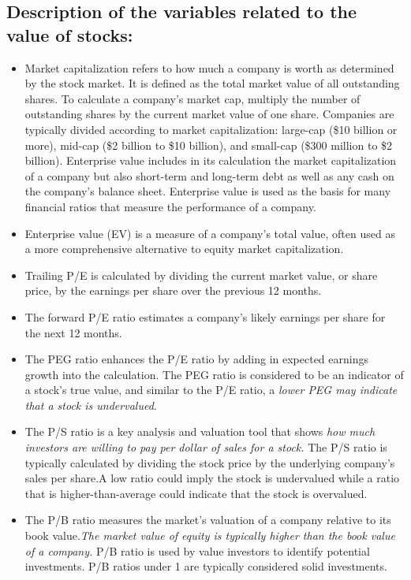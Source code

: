 \documentclass[11pt,a4paper,]{article}
\providecommand{\tightlist}{%
  \setlength{\itemsep}{0pt}\setlength{\parskip}{0pt}}
\begin{document}
\hypertarget{description-of-the-variables-related-to-the-value-of-stocks}{%
\subsection{Description of the variables related to the value of stocks:}\label{description-of-the-variables-related-to-the-value-of-stocks}}

\begin{itemize}
\tightlist
\item
  Market capitalization refers to how much a company is worth as determined by the stock market. It is defined as the total market value of all outstanding shares. To calculate a company's market cap, multiply the number of outstanding shares by the current market value of one share. Companies are typically divided according to market capitalization: large-cap (\$10 billion or more), mid-cap (\$2 billion to \$10 billion), and small-cap (\$300 million to \$2 billion). Enterprise value includes in its calculation the market capitalization of a company but also short-term and long-term debt as well as any cash on the company's balance sheet. Enterprise value is used as the basis for many financial ratios that measure the performance of a company.
\item
  Enterprise value (EV) is a measure of a company's total value, often used as a more comprehensive alternative to equity market capitalization.
\item
  Trailing P/E is calculated by dividing the current market value, or share price, by the earnings per share over the previous 12 months.
\item
  The forward P/E ratio estimates a company's likely earnings per share for the next 12 months.
\item
  The PEG ratio enhances the P/E ratio by adding in expected earnings growth into the calculation. The PEG ratio is considered to be an indicator of a stock's true value, and similar to the P/E ratio, a \emph{lower PEG may indicate that a stock is undervalued}.
\item
  The P/S ratio is a key analysis and valuation tool that shows \emph{how much investors are willing to pay per dollar of sales for a stock.} The P/S ratio is typically calculated by dividing the stock price by the underlying company's sales per share.A low ratio could imply the stock is undervalued while a ratio that is higher-than-average could indicate that the stock is overvalued.
\item
  The P/B ratio measures the market's valuation of a company relative to its book value.\emph{The market value of equity is typically higher than the book value of a company.} P/B ratio is used by value investors to identify potential investments. P/B ratios under 1 are typically considered solid investments.

\end{itemize}
\end{document}
